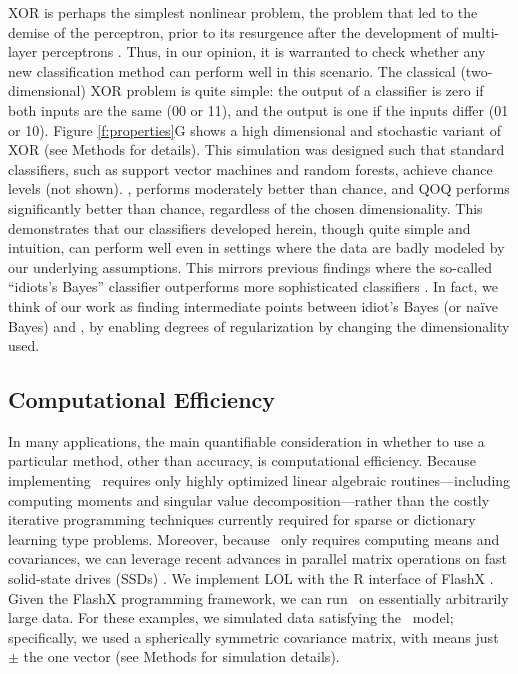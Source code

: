 \documentclass[10pt]{article}
\begin{document}
  XOR is perhaps the simplest nonlinear problem, the problem that led to the demise of the perceptron, prior to its resurgence after the development of multi-layer perceptrons \cite{Bishop2006a}.  Thus, in our opinion, it is warranted to check whether any new classification method can perform well in this scenario.  The classical (two-dimensional) XOR problem is quite simple: the output of a classifier is zero if both inputs are the same (00 or 11), and the output is one if the inputs differ (01 or 10).  Figure \ref{f:properties}G shows a high dimensional and stochastic variant of XOR (see Methods for details).  This simulation was designed such that standard classifiers, such as support vector machines and random forests, achieve chance levels (not shown).  \Lol, performs moderately better than chance, and QOQ performs significantly better than chance, regardless of the chosen dimensionality.  This demonstrates that our classifiers developed herein, though quite simple and intuition, can perform well even in settings where the data are badly modeled by our underlying assumptions.  This mirrors previous findings where the so-called ``idiots's Bayes'' classifier outperforms more sophisticated classifiers \cite{Bickel2004a}.  In fact, we think of our work as finding intermediate points between idiot's Bayes (or na\"ive Bayes) and \Fld, by enabling degrees of regularization by changing the dimensionality used.


\subsection*{Computational Efficiency}

In many applications, the main quantifiable consideration in whether to use a particular method, other than accuracy, is computational efficiency.  Because implementing \Lol~requires only highly optimized linear algebraic routines---including computing moments and singular value decomposition---rather than the costly iterative programming techniques currently required for sparse or dictionary learning type problems.  Moreover, because \Lol~only requires computing means and covariances, we can leverage recent advances in parallel matrix operations \cite{FlashMatrix} on fast solid-state drives (SSDs) \cite{SAFS}. We implement LOL with the R interface of FlashX \cite{FlashGraph, FlashMatrix, FlashEigen}.
Given the FlashX programming framework, we can run \Lol~on essentially arbitrarily large data.  For these examples, we simulated data satisfying the \Lda~model; specifically, we used a spherically symmetric covariance matrix, with means just $\pm$ the one vector (see Methods for simulation details).
\end{document}
